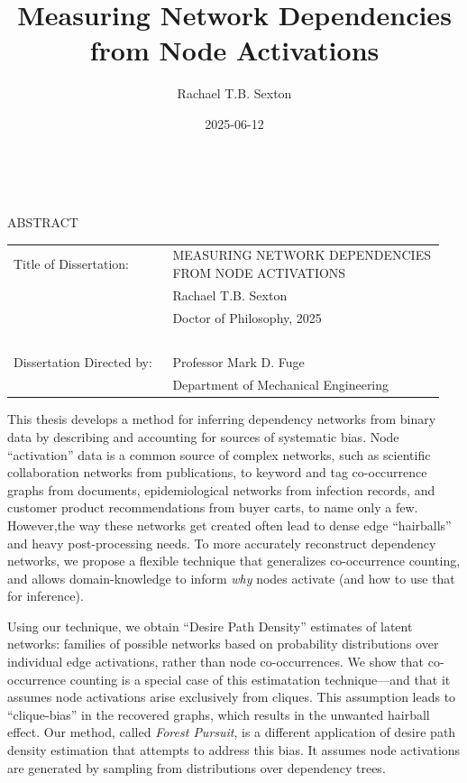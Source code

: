\documentclass[%
	12pt,
		oneside,
		letterpaper
]{book}
\title{Measuring Network Dependencies from Node Activations}
\author{Rachael T.B. Sexton}
\date{2025-06-12}
\begin{document}
\pagestyle{empty}
\singlespacing

\hbox{\ }

\begin{center}
\large{{ABSTRACT}}

\vspace{3em}

\end{center}
\hspace{-.15in}
\begin{tabular}{p{0.35\linewidth}p{0.6\linewidth}}
Title of Dissertation:     & {\large \uppercase{Measuring Network Dependencies from Node Activations}}\\
                           & {\large  Rachael T.B. Sexton } \\
                           & {\large Doctor of Philosophy, 2025} \\
\                         \\
Dissertation Directed by:  & {\large Professor Mark D. Fuge } \\
                           & {\large Department of Mechanical Engineering} \\
\end{tabular}

\vspace{3em}


\doublespacing
\large \normalsize
This thesis develops a method for inferring dependency networks from binary data by describing and accounting for sources of systematic bias.
Node ``activation'' data is a common source of complex networks, such as scientific collaboration networks from publications, to keyword and tag co-occurrence graphs from documents, epidemiological networks from infection records, and customer product recommendations from buyer carts, to name only a few.
However,the way these networks get created often lead to dense edge ``hairballs'' and heavy post-processing needs.
To more accurately reconstruct dependency networks, we propose a flexible technique that generalizes co-occurrence counting, and allows domain-knowledge to inform \emph{why} nodes activate (and how to use that for inference).

Using our technique, we obtain ``Desire Path Density'' estimates of latent networks: families of possible networks based on probability distributions over individual edge activations, rather than node co-occurrences.
We show that co-occurrence counting is a special case of this estimatation technique---and that it assumes node activations arise exclusively from cliques.
This assumption leads to ``clique-bias'' in the recovered graphs, which results in the unwanted hairball effect.
Our method, called \emph{Forest Pursuit}, is a different application of desire path density estimation that attempts to address this bias.
It assumes node activations are generated by sampling from distributions over dependency trees.
\end{document}
